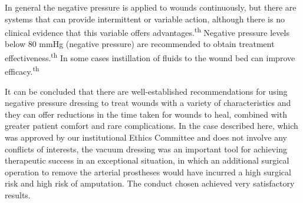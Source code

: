 \documentclass[numberinsection,times,10pt,spreadimages]{memoir}
\begin{document}
In general the negative pressure is applied to wounds continuously, but there
are
systems that can provide intermittent or variable action, although there is no
clinical evidence that this variable offers advantages.\textsuperscript{th}
Negative pressure levels below 80 mmHg
(negative pressure) are recommended to obtain treatment
effectiveness.\textsuperscript{th}
In some cases instillation
of fluids to the wound bed can improve efficacy.\textsuperscript{th}

It can be concluded that there are well-established recommendations for using
negative pressure dressing to treat wounds with a variety of characteristics and
they can offer reductions in the time taken for wounds to heal, combined with
greater patient comfort and rare complications. In the case described here,
which was approved by our institutional Ethics Committee and does not involve
any conflicts of interests, the vacuum dressing was an important tool for
achieving therapeutic success in an exceptional situation, in which an
additional surgical operation to remove the arterial prostheses would have
incurred a high surgical risk and high risk of amputation. The conduct chosen
achieved very satisfactory results.
\end{document}
